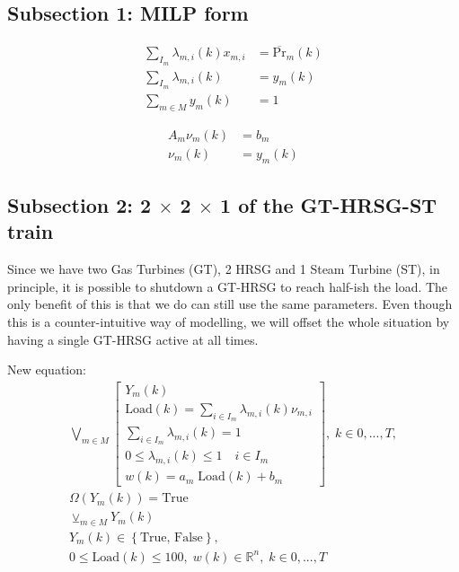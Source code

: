 \documentclass{tufte-handout}
\begin{document}
\subsection{Subsection 1: MILP form}
\begin{equation}
\begin{split}
\sum_{I_m} \lambda_{m, i} \left(k\right) x_{m, i} &= \overline{\text{Pr}}_m \left(k \right) \\
\sum_{I_m} \lambda_{m, i} \left(k\right) & = y_m \left(k\right) \\
\sum_{m \in M} y_m \left(k\right) & = 1
\end{split}
\end{equation}



\begin{equation}
\begin{split}
	A_m \nu_m \left(k\right) &= b_m \\
	\nu_m \left(k\right) & = y_{m} \left(k\right)
\end{split}
\end{equation}

\subsection{Subsection 2: 2 $\times$ 2 $\times$ 1 of the GT-HRSG-ST train}
Since we have two Gas Turbines (GT), 2 HRSG and 1 Steam Turbine (ST), in principle, it is possible to shutdown a GT-HRSG
to reach half-ish the load. The only benefit of this is that we do can still use the same parameters. 
Even though this is a counter-intuitive way of modelling, we will offset the whole situation by having a single GT-HRSG active at all times.

New equation:
\begin{gather*}
\bigvee_{m \in M}
  \begin{bmatrix} 
    Y_m \left(k\right)\\
    \text{Load} \left(k\right) = \sum_{i \in I_m} \lambda_{m,i} \left(k \right) \nu_{m, i}
    \\ 
    \sum_{i \in I_m} \lambda_{m,i} \left(k \right) = 1 \\
    0 \leq \lambda_{m,i} \left(k \right) \leq 1 \quad i\in I_m \\
    w \left(k \right) = a_m \; \text{Load}\left(k \right) + b_m
  \end{bmatrix}, \; k \in {0,...,T}, \\
\Omega \left(Y_m \left( k\right) \right) = \text{True} \\
\veebar_{m \in M} Y_m \left(k\right) \\
Y_m \left(k \right) \in \left\{\text{True, False} \right\}, \\
0 \leq \text{Load}\left(k \right) \leq 100, \; w\left(k\right) \in \mathbb{R}^{n},\; k \in {0,...,T}
\end{gather*}
\end{document}
